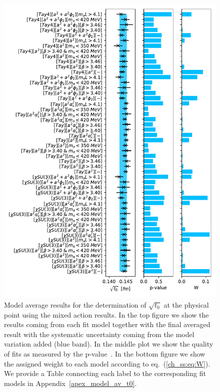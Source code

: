 \begin{figure}
    \centering
    \includegraphics[width=1.\textwidth]{./cap5/figs/BMA_tm.pdf}
    \caption{Model average results for the determination of $\sqrt{t_0}$ at the physical point using the mixed action results. In the top figure we show the results coming from each fit model together with the final averaged result with the systematic uncertainty coming from the model variation added (blue band). In the middle plot we show the quality of fits as measured by the p-value~\cite{chi_exp}. In the bottom figure we show the assigned weight to each model according to eq.~(\ref{ch_ss:eq:W}). We provide a Table connecting each label to the corresponding fit models in Appendix~\ref{apex_model_av_t0}.}
    \label{ch_ss:fig:BMA_tm}
\end{figure}

